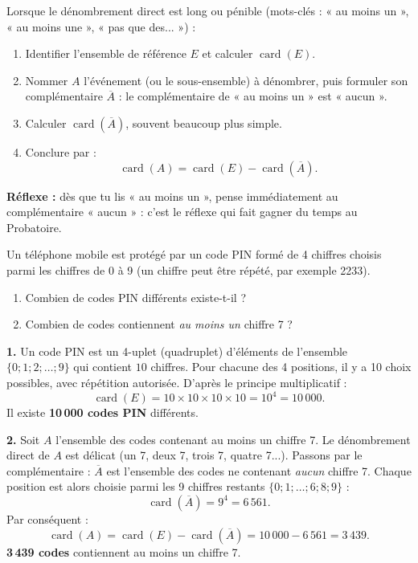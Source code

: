 \documentclass[11pt]{article}
\newcommand{\cle}[1]{{\popxbold\color{popdark}#1}}
\begin{document}
\begin{methode}
Lorsque le dénombrement direct est long ou pénible (mots-clés : « \cle{au moins un} », « \cle{au moins une} », « pas que des... ») :
\begin{enumerate}
\item Identifier l'ensemble de référence $E$ et calculer $\operatorname{card}(E)$.
\item Nommer $A$ l'événement (ou le sous-ensemble) à dénombrer, puis formuler son \cle{complémentaire} $\overline{A}$ : le complémentaire de « au moins un » est « \cle{aucun} ».
\item Calculer $\operatorname{card}(\overline{A})$, souvent beaucoup plus simple.
\item Conclure par :
\[ \operatorname{card}(A)=\operatorname{card}(E)-\operatorname{card}(\overline{A}). \]
\end{enumerate}
\textbf{Réflexe :} dès que tu lis « au moins un », pense immédiatement au complémentaire « aucun » : c'est le réflexe qui fait gagner du temps au Probatoire.
\end{methode}

\begin{exoresolu}
Un téléphone mobile est protégé par un code PIN formé de 4 chiffres choisis parmi les chiffres de 0 à 9 (un chiffre peut être répété, par exemple 2233).
\begin{enumerate}
\item Combien de codes PIN différents existe-t-il ?
\item Combien de codes contiennent \emph{au moins un} chiffre 7 ?
\end{enumerate}
\tcblower
\textbf{1.} Un code PIN est un 4-uplet (quadruplet) d'éléments de l'ensemble $\{0;1;2;\dots;9\}$ qui contient $10$ chiffres. Pour chacune des 4 positions, il y a 10 choix possibles, avec répétition autorisée. D'après le principe multiplicatif :
\[ \operatorname{card}(E)=10\times 10\times 10\times 10=10^4=10\,000. \]
Il existe \textbf{10\,000 codes PIN} différents.

\textbf{2.} Soit $A$ l'ensemble des codes contenant au moins un chiffre 7. Le dénombrement direct de $A$ est délicat (un 7, deux 7, trois 7, quatre 7...). Passons par le complémentaire : $\overline{A}$ est l'ensemble des codes ne contenant \emph{aucun} chiffre 7. Chaque position est alors choisie parmi les 9 chiffres restants $\{0;1;\dots;6;8;9\}$ :
\[ \operatorname{card}(\overline{A})=9^4=6\,561. \]
Par conséquent :
\[ \operatorname{card}(A)=\operatorname{card}(E)-\operatorname{card}(\overline{A})=10\,000-6\,561=3\,439. \]
\textbf{3\,439 codes} contiennent au moins un chiffre 7.
\end{exoresolu}
\end{document}
